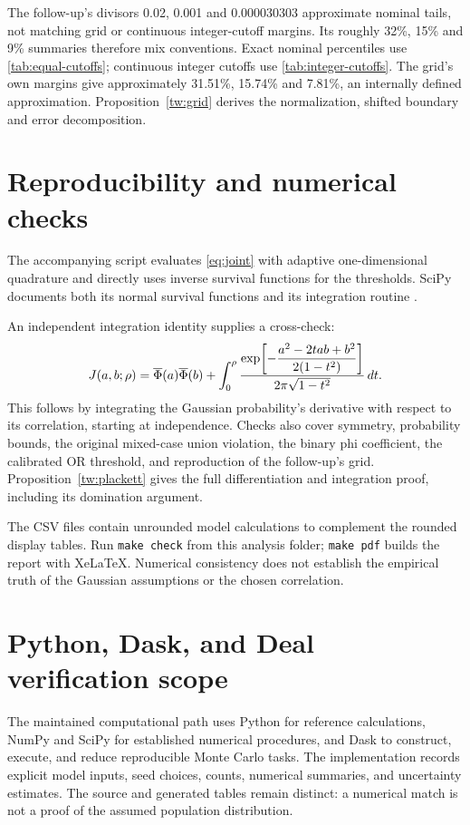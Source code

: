 The follow-up's divisors 0.02, 0.001 and 0.000030303 approximate nominal
tails, not matching grid or continuous integer-cutoff margins. Its roughly
32\%, 15\% and 9\% summaries therefore mix conventions. Exact nominal
percentiles use \cref{tab:equal-cutoffs}; continuous integer cutoffs use
\cref{tab:integer-cutoffs}. The grid's own margins give approximately
31.51\%, 15.74\% and 7.81\%, an internally defined approximation.
Proposition~\ref{tw:grid} derives the normalization, shifted boundary and
error decomposition.

\chapter{Reproducibility and numerical checks}\label{sec:reproduction}

The accompanying script evaluates \cref{eq:joint} with adaptive
one-dimensional quadrature and directly uses inverse survival functions
for the thresholds. SciPy documents both its normal survival functions
and its integration routine \citep{scipyNorm,scipyQuad}.

An independent integration identity supplies a cross-check:
\begin{equation}
J(a,b;\rho)=\overline{\Phi}(a)\overline{\Phi}(b)+\int_0^\rho
\frac{\exp\!\left[-\dfrac{a^2-2tab+b^2}{2(1-t^2)}\right]}
{2\pi\sqrt{1-t^2}}\,dt.
\label{eq:rho-integral}
\end{equation}
This follows by integrating the Gaussian probability's derivative with
respect to its correlation, starting at independence. Checks also cover
symmetry, probability bounds, the original mixed-case union violation,
the binary phi coefficient, the calibrated OR threshold, and reproduction
of the follow-up's grid. Proposition~\ref{tw:plackett} gives the full
differentiation and integration proof, including its domination argument.

The CSV files contain unrounded model calculations to complement the
rounded display tables. Run \texttt{make check} from this analysis folder;
\texttt{make pdf} builds the report with XeLaTeX. Numerical consistency
does not establish the empirical truth of the Gaussian assumptions or
the chosen correlation.

\chapter{Python, Dask, and Deal verification scope}
\label{sec:verification}
The maintained computational path uses Python for reference calculations,
NumPy and SciPy for established numerical procedures, and Dask to construct,
execute, and reduce reproducible Monte Carlo tasks. The implementation
records explicit model inputs, seed choices, counts, numerical summaries,
and uncertainty estimates. The source and generated tables remain distinct:
a numerical match is not a proof of the assumed population distribution.

